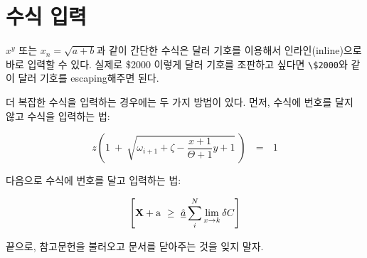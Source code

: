 \documentclass[11pt]{article}           %
\begin{document}
\section{수식 입력}
$x^y$ 또는 $x_n = \sqrt{a + b}$과 같이 간단한 수식은 달러 기호를 이용해서 인라인(inline)으로 바로 입력할 수 있다.
실제로 \$2000 이렇게 달러 기호를 조판하고 싶다면 \verb+\$2000+와 같이 달러 기호를 escaping해주면 된다.

더 복잡한 수식을 입력하는 경우에는 두 가지 방법이 있다.
먼저, 수식에 번호를 달지 않고 수식을 입력하는 법:

\[
    z \left( 1 \ +\  \sqrt{\omega_{i+1} + \zeta -\frac{x+1}{\Theta +1} y + 1} 
    \ \right)
    \ \ \ =\ \ \  1
\]

다음으로 수식에 번호를 달고 입력하는 법:

\begin{equation}
    \left[
    {\bf X} + {\rm a} \ \geq\ 
    \underline{\hat a} \sum_i^N \lim_{x \rightarrow k} \delta C
    \right]
\end{equation}

끝으로, 참고문헌을 불러오고 문서를 닫아주는 것을 잊지 말자.



\end{document}
